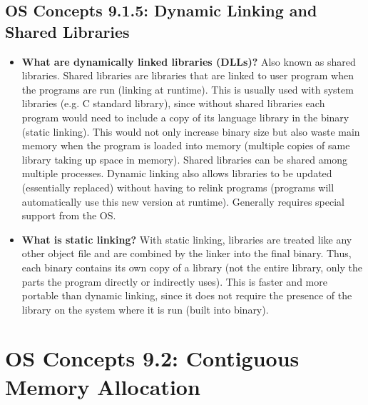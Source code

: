 \documentclass[12pt]{article}
\begin{document}
\subsection*{OS Concepts 9.1.5: Dynamic Linking and Shared Libraries}

\begin{itemize}
    \item \textbf{What are dynamically linked libraries (DLLs)?} Also known as shared libraries. Shared libraries are libraries that are linked to user program when the programs are run (linking at runtime). This is usually used with system libraries (e.g. C standard library), since without shared libraries each program would need to include a copy of its language library in the binary (static linking). This would not only increase binary size but also waste main memory when the program is loaded into memory (multiple copies of same library taking up space in memory). Shared libraries can be shared among multiple processes. Dynamic linking also allows libraries to be updated (essentially replaced) without having to relink programs (programs will automatically use this new version at runtime). Generally requires special support from the OS.
    \item \textbf{What is static linking?} With static linking, libraries are treated like any other object file and are combined by the linker into the final binary. Thus, each binary contains its own copy of a library (not the entire library, only the parts the program directly or indirectly uses). This is faster and more portable than dynamic linking, since it does not require the presence of the library on the system where it is run (built into binary).
\end{itemize}

\section*{OS Concepts 9.2: Contiguous Memory Allocation}
\end{document}
